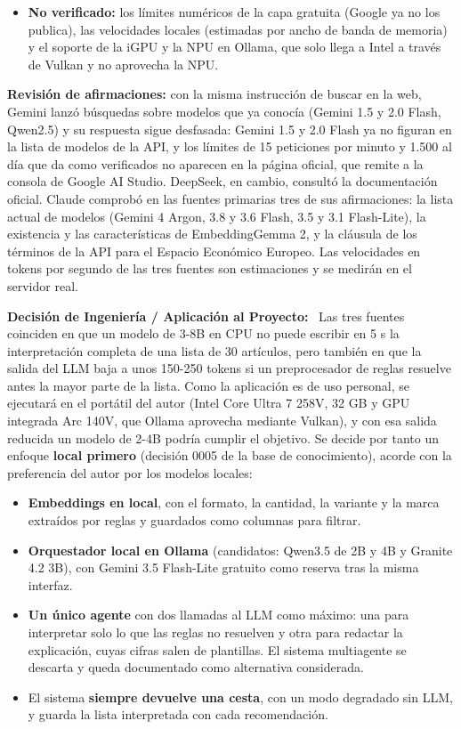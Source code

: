 \begin{tcolorbox}[colback=responsecolor, title=Insights de DeepSeek, colframe=gray!60!black, breakable]
\begin{itemize}
		\item \textbf{No verificado:} los límites numéricos de la capa gratuita (Google ya no los publica), las velocidades locales (estimadas por ancho de banda de memoria) y el soporte de la iGPU y la NPU en Ollama, que solo llega a Intel a través de Vulkan y no aprovecha la NPU.
	\end{itemize}
\end{tcolorbox}

\textbf{Revisión de afirmaciones:} con la misma instrucción de buscar en la web, Gemini lanzó búsquedas sobre modelos que ya conocía (Gemini 1.5 y 2.0 Flash, Qwen2.5) y su respuesta sigue desfasada: Gemini 1.5 y 2.0 Flash ya no figuran en la lista de modelos de la API, y los límites de 15 peticiones por minuto y 1.500 al día que da como verificados no aparecen en la página oficial, que remite a la consola de Google AI Studio. DeepSeek, en cambio, consultó la documentación oficial. Claude comprobó en las fuentes primarias tres de sus afirmaciones: la lista actual de modelos (Gemini 4 Argon, 3.8 y 3.6 Flash, 3.5 y 3.1 Flash-Lite), la existencia y las características de EmbeddingGemma 2, y la cláusula de los términos de la API para el Espacio Económico Europeo. Las velocidades en tokens por segundo de las tres fuentes son estimaciones y se medirán en el servidor real.

\textbf{Decisión de Ingeniería / Aplicación al Proyecto:} \
Las tres fuentes coinciden en que un modelo de 3-8B en CPU no puede escribir en 5 s la interpretación completa de una lista de 30 artículos, pero también en que la salida del LLM baja a unos 150-250 tokens si un preprocesador de reglas resuelve antes la mayor parte de la lista. Como la aplicación es de uso personal, se ejecutará en el portátil del autor (Intel Core Ultra 7 258V, 32 GB y GPU integrada Arc 140V, que Ollama aprovecha mediante Vulkan), y con esa salida reducida un modelo de 2-4B podría cumplir el objetivo. Se decide por tanto un enfoque \textbf{local primero} (decisión 0005 de la base de conocimiento), acorde con la preferencia del autor por los modelos locales:

\begin{itemize}
	\item \textbf{Embeddings en local}, con el formato, la cantidad, la variante y la marca extraídos por reglas y guardados como columnas para filtrar.
	\item \textbf{Orquestador local en Ollama} (candidatos: Qwen3.5 de 2B y 4B y Granite 4.2 3B), con Gemini 3.5 Flash-Lite gratuito como reserva tras la misma interfaz.
	\item \textbf{Un único agente} con dos llamadas al LLM como máximo: una para interpretar solo lo que las reglas no resuelven y otra para redactar la explicación, cuyas cifras salen de plantillas. El sistema multiagente se descarta y queda documentado como alternativa considerada.
	\item El sistema \textbf{siempre devuelve una cesta}, con un modo degradado sin LLM, y guarda la lista interpretada con cada recomendación.
\end{itemize}

